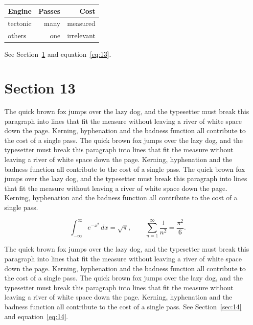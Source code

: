 \documentclass{article}
\begin{document}
\begin{center}
\begin{tabular}{lrr}
\toprule
Engine & Passes & Cost \\
\midrule
tectonic & many & measured \\
others & one & irrelevant \\
\bottomrule
\end{tabular}
\end{center}

See Section~\ref{sec:13} and equation~\eqref{eq:13}.
\section{Section 13}
\label{sec:13}
The quick brown fox jumps over the lazy dog, and the typesetter must break this paragraph into lines that fit the measure without leaving a river of white space down the page. Kerning, hyphenation and the badness function all contribute to the cost of a single pass. The quick brown fox jumps over the lazy dog, and the typesetter must break this paragraph into lines that fit the measure without leaving a river of white space down the page. Kerning, hyphenation and the badness function all contribute to the cost of a single pass. The quick brown fox jumps over the lazy dog, and the typesetter must break this paragraph into lines that fit the measure without leaving a river of white space down the page. Kerning, hyphenation and the badness function all contribute to the cost of a single pass. 

\begin{equation}\label{eq:13}
\int_{-\infty}^{\infty} e^{-x^{2}}\,dx = \sqrt{\pi}, \qquad
\sum_{n=1}^{\infty} \frac{1}{n^{2}} = \frac{\pi^{2}}{6}.
\end{equation}

The quick brown fox jumps over the lazy dog, and the typesetter must break this paragraph into lines that fit the measure without leaving a river of white space down the page. Kerning, hyphenation and the badness function all contribute to the cost of a single pass. The quick brown fox jumps over the lazy dog, and the typesetter must break this paragraph into lines that fit the measure without leaving a river of white space down the page. Kerning, hyphenation and the badness function all contribute to the cost of a single pass. 
See Section~\ref{sec:14} and equation~\eqref{eq:14}.
\end{document}
